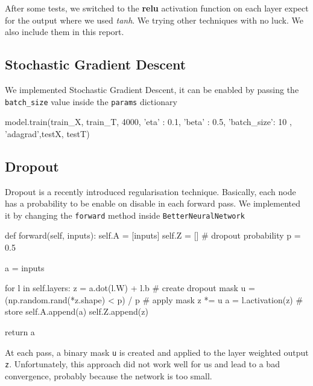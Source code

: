 \documentclass[11pt]{article}
\begin{document}
After some tests, we switched to the \textbf{relu} activation function on each layer expect for the output where we used \emph{tanh}. 
We trying other techniques with no luck. We also include them in this report.
\subsection{Stochastic Gradient Descent}
We implemented Stochastic Gradient Descent, it can be enabled by passing the \texttt{batch\_size} value inside the \texttt{params} dictionary

\begin{python}
model.train(train_X, train_T, 4000, { 'eta' : 0.1, 'beta' : 0.5, 'batch_size': 10 }, 'adagrad',testX, testT)	
\end{python}
\subsection{Dropout}
Dropout is a recently introduced regularisation technique. Basically, each node has a probability to be enable on disable in each forward pass. We implemented it by changing the \texttt{forward} method inside \texttt{BetterNeuralNetwork}
\begin{python}
def forward(self, inputs):
    self.A = [inputs]
    self.Z = []
    # dropout probability
    p = 0.5
    
    a = inputs

    for l in self.layers:
        z = a.dot(l.W) + l.b
        # create dropout mask
        u = (np.random.rand(*z.shape) < p) / p
        # apply mask
        z *= u
        a = l.activation(z)
        # store
        self.A.append(a)
        self.Z.append(z)

    return a
\end{python}
At each pass, a binary mask \texttt{u} is created and applied to the layer weighted output \texttt{z}. Unfortunately, this approach did not work well for us and lead to a bad convergence, probably because the network is too small.
\end{document}
